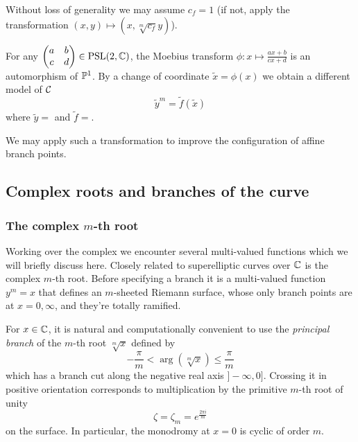 \documentclass[main.tex]{subfiles}
\begin{document}
  \begin{rmk}
   Without loss of generality we may assume $c_f = 1$ (if not, apply the transformation $(x,y) \mapsto (x,\sqrt[m]{c_f}y)$).
  \end{rmk}
  \begin{rmk}
      \label{rmk:moebius}
      For any $\begin{pmatrix}a&b\\c&d\end{pmatrix}\in\PSl(2,\C)$,
      the Moebius transform $\phi:x\mapsto \frac{ax+b}{cx+d}$ is an automorphism
      of $\P^1$. By a change of coordinate $\tilde x=\phi(x)$ we obtain a different model of $\cu$
      \begin{equation}
          \tilde y^m = \tilde f(\tilde x)
      \end{equation}
      where $\tilde y=$ and $\tilde f=$.

  We may apply such a transformation to improve the configuration
  of affine branch points.
  \end{rmk}

  \subsection{Complex roots and branches of the curve}\label{subsec:roots_branches}

  \subsubsection{The complex $m$-th root}

  Working over the complex we encounter several multi-valued functions
  which we will briefly discuss here.  Closely related to superelliptic
  curves over $\C$ is the complex $m$-th root.
  Before specifying a branch it is a multi-valued function $y^m = x$
  that defines an $m$-sheeted Riemann surface, whose only branch points
  are at $x = 0,\infty$, and they're totally ramified.

  For $x\in\C$, it is natural and computationally convenient to use the
  \emph{principal branch} of the $m$-th root $\sqrt[m]x$ defined by
  \begin{equation}
      \label{eq:principal_mth_root}
      -\frac{π}m<\arg(\sqrt[m]x)\leq\frac{π}m
  \end{equation}
  which has a branch cut along the negative real axis $]\!-\infty,0]$.
  Crossing it in positive orientation corresponds to multiplication by
  the primitive $m$-th root of unity
  \begin{equation}
      \label{eq:zeta}
  \zeta = \zeta_m = e^{\frac{2\pi i }{m}}
  \end{equation}
  on the surface. In
  particular, the monodromy at $x=0$ is cyclic of order $m$.
\end{document}
